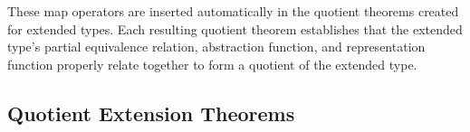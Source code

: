 \documentclass[envcountsame,runningheads]{llncs}
\newcommand{\quotient}{partial equivalence}
\begin{document}
These map operators are inserted automatically
in the quotient theorems created
for extended types.
Each resulting quotient theorem establishes that the extended type's
\quotient{} relation,
abstraction function, and representation function properly relate together
to form a quotient of the
extended type.


%
\subsection{Quotient Extension Theorems}
%
\label{condquotients}

%
\end{document}
